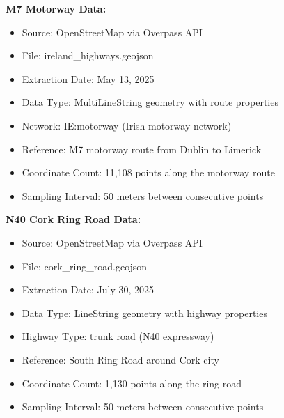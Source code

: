 \documentclass[MScCS]{uccthesis}
\begin{document}
   \textbf{M7 Motorway Data:}
   \begin{itemize}
   \item Source: OpenStreetMap via Overpass API
   \item File: ireland\_highways.geojson
   \item Extraction Date: May 13, 2025
   \item Data Type: MultiLineString geometry with route properties
   \item Network: IE:motorway (Irish motorway network)
   \item Reference: M7 motorway route from Dublin to Limerick
   \item Coordinate Count: 11,108 points along the motorway route
   \item Sampling Interval: 50 meters between consecutive points
   \end{itemize}

   \textbf{N40 Cork Ring Road Data:}
   \begin{itemize}
   \item Source: OpenStreetMap via Overpass API
   \item File: cork\_ring\_road.geojson
   \item Extraction Date: July 30, 2025
   \item Data Type: LineString geometry with highway properties
   \item Highway Type: trunk road (N40 expressway)
   \item Reference: South Ring Road around Cork city
   \item Coordinate Count: 1,130 points along the ring road
   \item Sampling Interval: 50 meters between consecutive points
   \end{itemize}

\begin{center}
\end{center}
\end{document}

